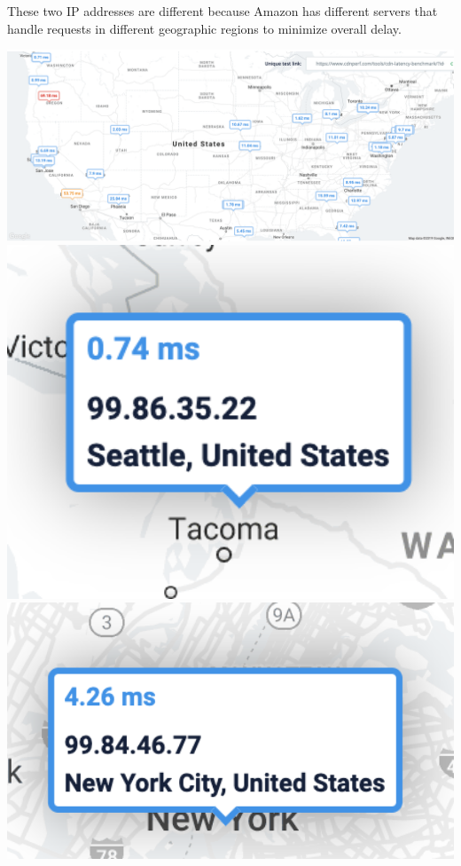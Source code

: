 \documentclass[11pt]{article}
\begin{document}
\begin{enumerate}[(a)]
      These two IP addresses are different because Amazon has different servers
      that handle requests in different geographic regions to minimize overall
      delay.

      \includegraphics[width=15cm]{8} \\
      \includegraphics[width=15cm]{9} \\
      \includegraphics[width=15cm]{10}

\end{enumerate}
\end{document}
